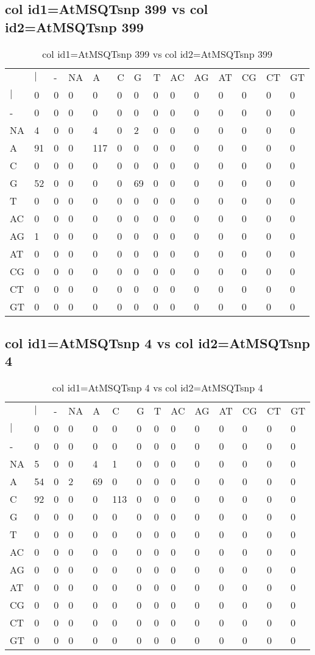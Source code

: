 \subsection{col id1=AtMSQTsnp 399 vs col id2=AtMSQTsnp 399}
\begin{center}
\begin{longtable}{|l|l|l|l|l|l|l|l|l|l|l|l|l|l|}
\caption{col id1=AtMSQTsnp 399 vs col id2=AtMSQTsnp 399} \label{table_dm908}\\
\hline
\\
\hline
&$|$&-&NA&A&C&G&T&AC&AG&AT&CG&CT&GT\\
$|$&0&0&0&0&0&0&0&0&0&0&0&0&0\\
-&0&0&0&0&0&0&0&0&0&0&0&0&0\\
NA&4&0&0&4&0&2&0&0&0&0&0&0&0\\
A&91&0&0&117&0&0&0&0&0&0&0&0&0\\
C&0&0&0&0&0&0&0&0&0&0&0&0&0\\
G&52&0&0&0&0&69&0&0&0&0&0&0&0\\
T&0&0&0&0&0&0&0&0&0&0&0&0&0\\
AC&0&0&0&0&0&0&0&0&0&0&0&0&0\\
AG&1&0&0&0&0&0&0&0&0&0&0&0&0\\
AT&0&0&0&0&0&0&0&0&0&0&0&0&0\\
CG&0&0&0&0&0&0&0&0&0&0&0&0&0\\
CT&0&0&0&0&0&0&0&0&0&0&0&0&0\\
GT&0&0&0&0&0&0&0&0&0&0&0&0&0\\
\hline
\end{longtable}
\end{center}

\subsection{col id1=AtMSQTsnp 4 vs col id2=AtMSQTsnp 4}
\begin{center}
\begin{longtable}{|l|l|l|l|l|l|l|l|l|l|l|l|l|l|}
\caption{col id1=AtMSQTsnp 4 vs col id2=AtMSQTsnp 4} \label{table_dm910}\\
\hline
\\
\hline
&$|$&-&NA&A&C&G&T&AC&AG&AT&CG&CT&GT\\
$|$&0&0&0&0&0&0&0&0&0&0&0&0&0\\
-&0&0&0&0&0&0&0&0&0&0&0&0&0\\
NA&5&0&0&4&1&0&0&0&0&0&0&0&0\\
A&54&0&2&69&0&0&0&0&0&0&0&0&0\\
C&92&0&0&0&113&0&0&0&0&0&0&0&0\\
G&0&0&0&0&0&0&0&0&0&0&0&0&0\\
T&0&0&0&0&0&0&0&0&0&0&0&0&0\\
AC&0&0&0&0&0&0&0&0&0&0&0&0&0\\
AG&0&0&0&0&0&0&0&0&0&0&0&0&0\\
AT&0&0&0&0&0&0&0&0&0&0&0&0&0\\
CG&0&0&0&0&0&0&0&0&0&0&0&0&0\\
CT&0&0&0&0&0&0&0&0&0&0&0&0&0\\
GT&0&0&0&0&0&0&0&0&0&0&0&0&0\\
\hline
\end{longtable}
\end{center}

